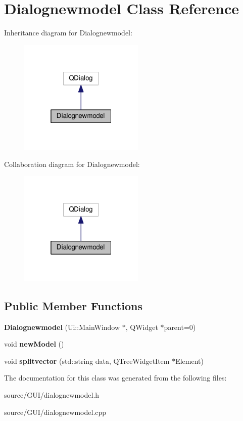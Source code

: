 \section{Dialognewmodel Class Reference}
\label{class_dialognewmodel}


Inheritance diagram for Dialognewmodel\+:\nopagebreak
\begin{figure}[H]
\begin{center}
\leavevmode
\includegraphics[width=169pt]{class_dialognewmodel__inherit__graph}
\end{center}
\end{figure}


Collaboration diagram for Dialognewmodel\+:\nopagebreak
\begin{figure}[H]
\begin{center}
\leavevmode
\includegraphics[width=169pt]{class_dialognewmodel__coll__graph}
\end{center}
\end{figure}
\subsection*{Public Member Functions}
\begin{DoxyCompactItemize}
\item 
{\bfseries Dialognewmodel} (Ui\+::\+Main\+Window $\ast$, Q\+Widget $\ast$parent=0)\label{class_dialognewmodel_af4bd51090e0a7b566c142c2e75aae63e}

\item 
void {\bfseries new\+Model} ()\label{class_dialognewmodel_a7d74869c6d8bed6ff4e7837a34602ab8}

\item 
void {\bfseries splitvector} (std\+::string data, Q\+Tree\+Widget\+Item $\ast$Element)\label{class_dialognewmodel_a5e6c5929fe0189d6cc3b0e70fb29130e}

\end{DoxyCompactItemize}


The documentation for this class was generated from the following files\+:\begin{DoxyCompactItemize}
\item 
source/\+G\+U\+I/dialognewmodel.\+h\item 
source/\+G\+U\+I/dialognewmodel.\+cpp\end{DoxyCompactItemize}
